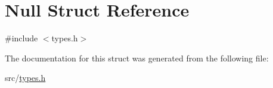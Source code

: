 \hypertarget{struct_null}{}\section{Null Struct Reference}
\label{struct_null}


{\ttfamily \#include $<$types.\+h$>$}



The documentation for this struct was generated from the following file\+:\begin{DoxyCompactItemize}
\item 
src/\hyperlink{types_8h}{types.\+h}\end{DoxyCompactItemize}
